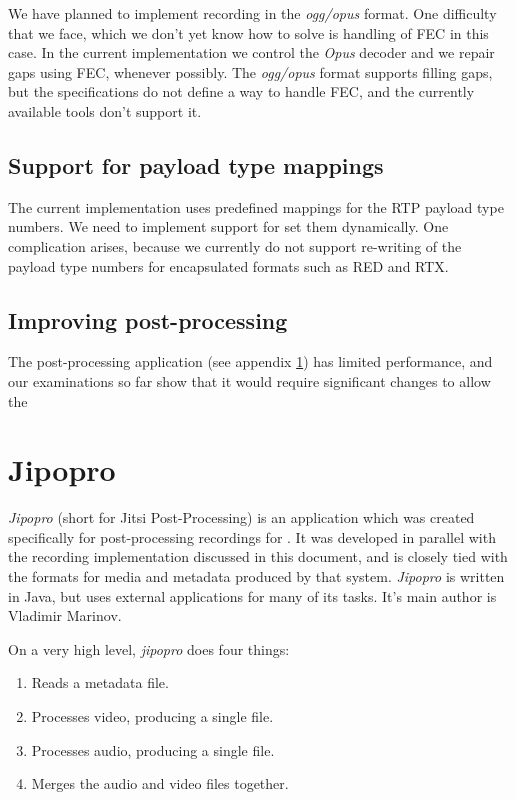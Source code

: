 \documentclass[twoside,openright,a4paper,12pt,english]{article}
\begin{document}
We have planned to implement recording in the \emph{ogg/opus} format. One difficulty
that we face, which we don't yet know how to solve is handling of FEC in this
case. In the current implementation we control the \emph{Opus} decoder and we
repair gaps using FEC, whenever possibly. The \emph{ogg/opus} format supports
filling gaps, but the specifications\cite{ogg,ogg-opus} do not define a way to
handle FEC, and the currently available tools don't support it.

\subsection{Support for payload type mappings}
The current implementation uses predefined mappings for the RTP payload type
numbers. We need to implement support for set them dynamically. One complication arises,
because we currently do not support re-writing of the payload type numbers for encapsulated
formats such as RED and RTX.

\subsection{Improving post-processing}
The post-processing application (see appendix \ref{jipopro}) has limited performance, and
our examinations so far show that it would require significant changes to allow the 





\clearpage
\appendix
\section{Jipopro}
\label{jipopro}
\emph{Jipopro} (short for Jitsi Post-Processing) is an application which was created
specifically for post-processing recordings for \jm. It was developed in parallel with
the recording implementation discussed in this document, and is closely tied
with the formats for media and metadata produced by that system. \emph{Jipopro}
is written in Java, but uses external applications for many of its tasks. It's
main author is Vladimir Marinov.

On a very high level, \emph{jipopro} does four things:
\begin{enumerate}
\item Reads a metadata file.
\item Processes video, producing a single file.
\item Processes audio, producing a single file.
\item Merges the audio and video files together.
\end{enumerate}
\end{document}
